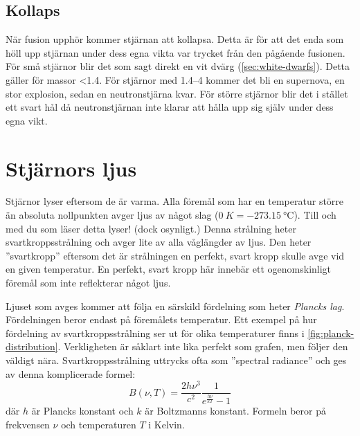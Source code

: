 \subsection{Kollaps}
När fusion upphör kommer stjärnan att kollapsa. Detta är för att det enda som höll upp stjärnan under dess egna vikta var trycket från den pågående fusionen. För små stjärnor blir det som sagt direkt en vit dvärg (\vref{sec:white-dwarfs}). Detta gäller för massor \qty{<1.4}{\Mo}. För stjärnor med \qtyrange{1.4}{4}{\Mo} kommer det bli en supernova, en stor explosion, sedan en neutronstjärna kvar. För större stjärnor blir det i stället ett svart hål då neutronstjärnan inte klarar att hålla upp sig själv under dess egna vikt.


\section{Stjärnors ljus}
Stjärnor lyser eftersom de är varma. Alla föremål som har en temperatur större än absoluta nollpunkten avger ljus av något slag ($\qty{0}{K} = \qty{-273.15}{\degreeCelsius}$). Till och med du som läser detta lyser! (dock osynligt.) Denna strålning heter svartkroppsstrålning och avger lite av alla våglängder av ljus. Den heter ''svartkropp'' eftersom det är strålningen en perfekt, svart kropp skulle avge vid en given temperatur. En perfekt, svart kropp här innebär ett ogenomskinligt föremål som inte reflekterar något ljus.

Ljuset som avges kommer att följa en särskild fördelning som heter \emph{Plancks lag}. Fördelningen beror endast på föremålets temperatur. Ett exempel på hur fördelning av svartkroppsstrålning ser ut för olika temperaturer finns i \cref{fig:planck-distribution}. Verkligheten är såklart inte lika perfekt som grafen, men följer den väldigt nära. Svartkroppsstrålning uttrycks ofta som ''spectral radiance'' och ges av denna komplicerade formel:
\begin{equation}
    B(\nu, T) = \frac{2h\nu^3}{c^2} \frac{1}{e^{\frac{h\nu}{kT}} - 1}
    \label{eq:planck-distribution}
\end{equation}
där $h$ är Plancks konstant och $k$ är Boltzmanns konstant. Formeln beror på frekvensen $\nu$ och temperaturen $T$ i Kelvin.

